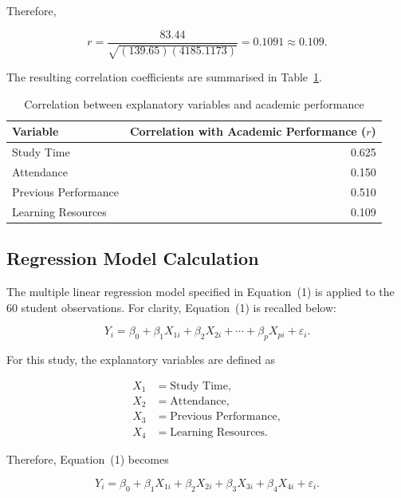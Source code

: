 Therefore,

\begin{equation}
r =
\frac{83.44}
{\sqrt{(139.65)(4185.1173)}}
=0.1091\approx\mathbf{0.109}.
\end{equation}

The resulting correlation coefficients are summarised in Table~\ref{tab:correlation}.

\begin{table}[htbp]
\centering
\caption{Correlation between explanatory variables and academic performance}
\label{tab:correlation}
\begin{tabular}{lr}
\toprule
Variable & Correlation with Academic Performance ($r$) \\
\midrule
Study Time & 0.625 \\
Attendance & 0.150 \\
Previous Performance & 0.510 \\
Learning Resources & 0.109 \\
\bottomrule
\end{tabular}
\end{table}


\subsection{Regression Model Calculation}

The multiple linear regression model specified in Equation~(1) is applied to the 60 student observations. For clarity, Equation~(1) is recalled below:

\begin{equation}
Y_i = \beta_0 + \beta_1 X_{1i} + \beta_2 X_{2i}
+ \cdots + \beta_p X_{pi} + \varepsilon_i.
\tag{1}
\end{equation}

For this study, the explanatory variables are defined as

\begin{align*}
X_1 &= \text{Study Time},\\
X_2 &= \text{Attendance},\\
X_3 &= \text{Previous Performance},\\
X_4 &= \text{Learning Resources}.
\end{align*}

Therefore, Equation~(1) becomes

\begin{equation}
Y_i = \beta_0 + \beta_1 X_{1i} + \beta_2 X_{2i}
+ \beta_3 X_{3i} + \beta_4 X_{4i} + \varepsilon_i.
\end{equation}

